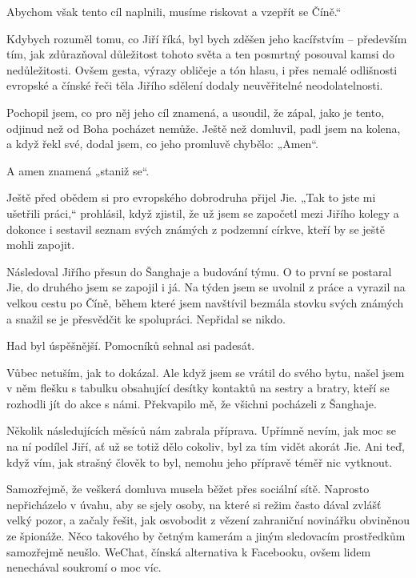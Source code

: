 Abychom však tento cíl naplnili, musíme riskovat a vzepřít se Číně.“

Kdybych rozuměl tomu, co Jiří říká, byl bych zděšen jeho kacířstvím – především tím, jak zdůrazňoval důležitost tohoto světa a ten posmrtný posouval kamsi do nedůležitosti. Ovšem gesta, výrazy obličeje a tón hlasu, i přes nemalé odlišnosti evropské a čínské řeči těla Jiřího sdělení dodaly neuvěřitelné neodolatelnosti. 

Pochopil jsem, co pro něj jeho cíl znamená, a usoudil, že zápal, jako je tento, odjinud než od Boha pocházet nemůže. Ještě než domluvil, padl jsem na kolena, a když řekl své, dodal jsem, co jeho promluvě chybělo: „Amen“.

A amen znamená „staniž se“.
\vspace{0.75cm}

Ještě před obědem si pro evropského dobrodruha přijel Jie. „Tak to jste mi ušetřili práci,“ prohlásil, když zjistil, že už jsem se započetl mezi Jiřího kolegy a dokonce i sestavil seznam svých známých z podzemní církve, kteří by se ještě mohli zapojit.

Následoval Jiřího přesun do Šanghaje a budování týmu. O to první se postaral Jie, do druhého jsem se zapojil i já. Na týden jsem se uvolnil z práce a vyrazil na velkou cestu po Číně, během které jsem navštívil bezmála stovku svých známých a snažil se je přesvědčit ke spolupráci. Nepřidal se nikdo.

Had byl úspěšnější. Pomocníků sehnal asi padesát.

Vůbec netuším, jak to dokázal. Ale když jsem se vrátil do svého bytu, našel jsem v něm flešku s tabulku obsahující desítky kontaktů na sestry a bratry, kteří se rozhodli jít do akce s námi. Překvapilo mě, že všichni pocházeli z Šanghaje.

Několik následujících měsíců nám zabrala příprava. Upřímně nevím, jak moc se na ní podílel Jiří, ať už se totiž dělo cokoliv, byl za tím vidět akorát Jie. Ani teď, když vím, jak strašný člověk to byl, nemohu jeho přípravě téměř nic vytknout.

Samozřejmě, že veškerá domluva musela běžet přes sociální sítě. Naprosto nepřicházelo v úvahu, aby se sjely osoby, na které si režim často dával zvlášť velký pozor, a začaly řešit, jak osvobodit z vězení zahraniční novinářku obviněnou ze špionáže. Něco takového by četným kamerám a jiným sledovacím prostředkům samozřejmě neušlo. WeChat, čínská alternativa k Facebooku, ovšem lidem nenechával soukromí o moc víc.

